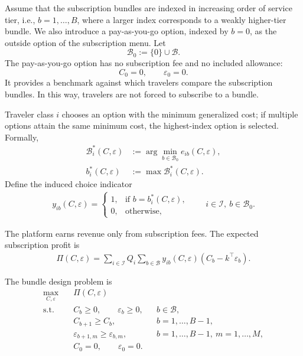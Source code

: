\documentclass{article}
\newcommand{\setB}{\mathcal{B}}
\newcommand{\setI}{\mathcal{I}}
\begin{document}
Assume that the subscription bundles are indexed in increasing order of service
tier, i.e., $b=1,\dots,B$, where a larger index corresponds to a weakly
higher-tier bundle. We also introduce a pay-as-you-go option, indexed by
$b=0$, as the outside option of the subscription menu. Let
\[
\setB_0:=\{0\}\cup\setB .
\]
The pay-as-you-go option has no subscription fee and no included allowance:
\[
C_0=0,\qquad \varepsilon_0=0 .
\]
It provides a benchmark against which travelers compare the subscription
bundles. In this way, travelers are not forced to subscribe to a bundle.

Traveler class $i$ chooses an option with the minimum generalized
cost; if multiple options attain the same minimum cost, the highest-index option
is selected. Formally,
\begin{align}
\mathcal B_i^*(C,\varepsilon)
&:=
\arg\min_{b\in\setB_0} e_{ib}(C,\varepsilon),
\label{eq:bundle-design-argmin}
\\
b_i^*(C,\varepsilon)
&:=
\max \mathcal B_i^*(C,\varepsilon).
\label{eq:bundle-design-tiebreak}
\end{align}
Define the induced choice indicator
\begin{align}
y_{ib}(C,\varepsilon)
=
\begin{cases}
1, & \text{if } b=b_i^*(C,\varepsilon),\\
0, & \text{otherwise},
\end{cases}
\qquad i\in\setI,\ b\in\setB_0.
\label{eq:bundle-design-indicator}
\end{align}

The platform earns revenue only from subscription fees. The expected subscription profit is
\begin{align}
\Pi(C,\varepsilon)
=
\sum_{i\in\setI} Q_i
\sum_{b\in\setB}
y_{ib}(C,\varepsilon)
\left(C_b-k^\top\varepsilon_b\right).
\label{eq:bundle-design-profit}
\end{align}

The bundle design problem is
\begin{align}
\max_{C,\varepsilon}\quad
&
\Pi(C,\varepsilon)
\label{eq:bundle-design-obj}
\\
\text{s.t.}\quad
&
C_b\ge 0,\qquad \varepsilon_b\ge 0,
&& b\in\setB,
\label{eq:bundle-design-feasibility}
\\
&
C_{b+1}\ge C_b,
&& b=1,\dots,B-1,
\label{eq:bundle-design-monotone-price}
\\
&
\varepsilon_{b+1,m}\ge \varepsilon_{b,m},
&& b=1,\dots,B-1,\ m=1,\dots,M,
\label{eq:bundle-design-monotone-allowance}
\\
&
C_0=0,\qquad \varepsilon_0=0.
\label{eq:bundle-design-payg}
\end{align}
\end{document}
